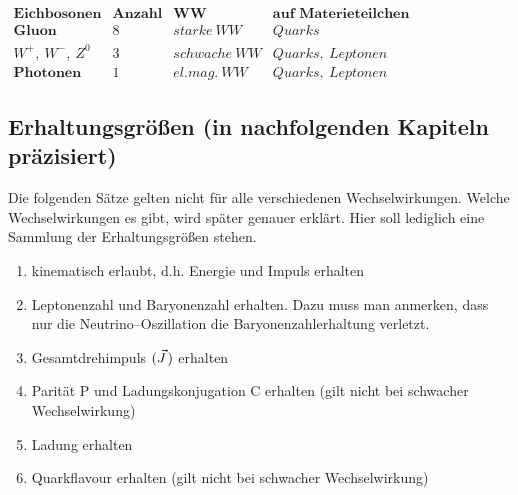 \documentclass[Ex4_Zusammenfassung.tex]{subfiles}
\begin{document}
%	
	
	$
	\begin{array}{c|ccc}
		\textbf{Eichbosonen} & \textbf{Anzahl} & \textbf{WW} & \textbf{auf Materieteilchen} \\
		\hline
		\textbf{Gluon} & 8 & starke\ WW & Quarks \\ 
		W^+,\ W^-,\ Z^0 & 3 & schwache\ WW & Quarks,\ Leptonen \\ 
		\textbf{Photonen} & 1 & el.mag.\ WW & Quarks,\ Leptonen
	\end{array} 
	$

\subsection{Erhaltungsgrößen (in nachfolgenden Kapiteln präzisiert)}
Die folgenden Sätze gelten nicht für alle verschiedenen Wechselwirkungen. Welche Wechselwirkungen es gibt, wird später genauer erklärt. Hier soll lediglich eine Sammlung der Erhaltungsgrößen stehen. 

\begin{enumerate}
	\item kinematisch erlaubt, d.h. Energie und Impuls erhalten
	
	\item Leptonenzahl und Baryonenzahl erhalten. Dazu muss man anmerken, dass nur die Neutrino--Oszillation die Baryonenzahlerhaltung verletzt.
	
	\item Gesamtdrehimpuls $(\pvec{J})$ erhalten
	
	\item Parität P und Ladungskonjugation C erhalten (gilt nicht bei schwacher Wechselwirkung)
	
	\item Ladung erhalten
	
	\item Quarkflavour erhalten (gilt nicht bei schwacher Wechselwirkung)
\end{enumerate}
\end{document}
